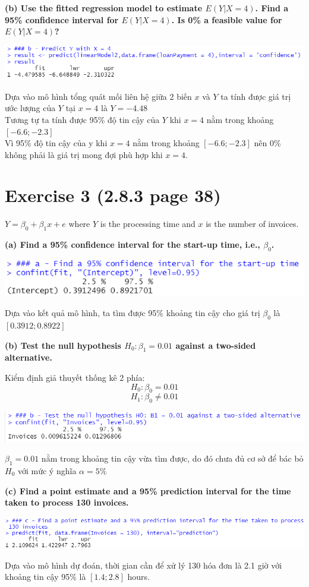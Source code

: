 \documentclass[a4paper]{article}
\theoremstyle{nonumberplain}
\begin{document}
\textbf{(b) Use the fitted regression model to estimate $E(Y |X=4)$. Find a 95\% confidence interval for $E(Y |X=4)$. Is 0\% a feasible value for $E (Y |X=4)$?}

\begin{center}
\includegraphics[scale = 0.8]{2b.PNG} 
\end{center}

Dựa vào mô hình tổng quát mối liên hệ giữa 2 biến $x$ và $Y$ ta tính được giá trị ước lượng của $Y$ tại $ x = 4$   là $Y = -4.48$\\
Tương tự ta tính được 95\% độ tin cậy của $Y$ khi  $x = 4$ nằm trong khoảng $[-6.6;-2.3] $\\
Vì 95\% độ tin cậy của y khi $x = 4$ nằm trong khoảng  $[-6.6;-2.3]$ nên 0\% không phải là giá trị mong đợi phù hợp khi $x = 4$.

\newpage
\section*{Exercise 3 (2.8.3 page 38)}
$Y = \beta_0 + \beta_1 x + e$ where 
$Y$ is the processing time and $x$ is the
number of invoices.

\textbf{(a) Find a 95\% confidence interval for the start-up time, i.e., $\beta_0$.}

\begin{center}
\includegraphics[scale = 0.8]{3a.PNG} 
\end{center}

Dựa vào kết quả mô hình, ta tìm được 95\% khoảng tin cậy cho giá trị $\beta_0$ là $[0.3912;0.8922]$

\textbf{(b) Test the null hypothesis
$H_0: \beta_1 = 0.01$ against a two-sided alternative.}

Kiểm định giả thuyết thống kê 2 phía:
$$H_0: \beta_0 = 0.01$$
$$H_1: \beta_0 \neq 0.01$$

\begin{center}
\includegraphics[scale = 0.8]{3b.PNG} 
\end{center}
$\beta_1 = 0.01$ nằm trong khoảng tin cậy vừa tìm được, do đó chưa đủ cơ sở để bác bỏ $H_0$ với mức ý nghĩa $\alpha = 5\%$ 

\textbf{(c) Find a point estimate and a 95\% prediction interval for the time taken to process 130 invoices.}

\begin{center}
\includegraphics[scale = 0.8]{3c.PNG} 
\end{center}
Dựa vào mô hình dự đoán, thời gian cần để xử lý 130 hóa đơn là 2.1 giờ với khoảng tin cậy 95\% là $[1.4; 2.8]$ hours.
\end{document}
